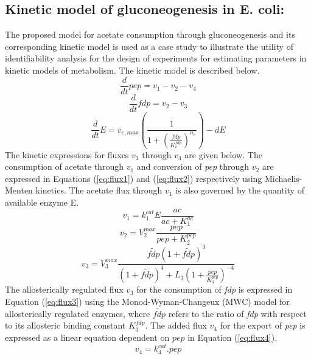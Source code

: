 \documentclass[10pt]{article}
\begin{document}
\subsection{Kinetic model of gluconeogenesis in E. coli:}\label{sec:small-model}
The proposed model for acetate consumption through gluconeogenesis and its corresponding kinetic model is used as a case study to illustrate the utility of identifiability analysis for the design of experiments for estimating parameters in kinetic models of metabolism. The kinetic model is described below.
\begin{equation}\label{eq:ode1}
\frac{d}{dt}pep=v_1-v_2-v_4
\end{equation}
\begin{equation}\label{eq:ode2}
\frac{d}{dt}fdp=v_2-v_3
\end{equation}
\begin{equation}\label{eq:ode3}
\frac{d}{dt}E=v_{e,max}\left(\frac{1}{1+\left(\frac{fdp}{K_{e}^{fdp}}\right)^{n_e}}\right) - d E
\end{equation}
The kinetic expressions for fluxes $v_1$ through $v_4$ are given below. The consumption of acetate through $v_1$ and conversion of \textit{pep} through $v_2$ are expressed in Equations (\ref{eq:flux1}) and (\ref{eq:flux2}) respectively using Michaelis-Menten kinetics. The acetate flux through $v_1$ is also governed by the quantity of available enzyme E. 
\begin{equation}\label{eq:flux1}
v_1 = k_{1}^{cat}E\frac{ac}{ac+K_{1}^{ac}}
\end{equation}	
\begin{equation}\label{eq:flux2}
v_2 = V_{2}^{max}\frac{pep}{pep+K_{2}^{pep}}
\end{equation}
\begin{equation}\label{eq:flux3}
v_3 = V_{3}^{max}\frac{\tilde{fdp}\left(1+\tilde{fdp}\right)^3}{\left(1+\tilde{fdp}\right)^4+L_3\left(1+\frac{pep}{K_{3}^{pep}}\right)^{-4}}
\end{equation}
The allosterically regulated flux $v_3$ for the consumption of \textit{fdp} is expressed in Equation (\ref{eq:flux3}) using the Monod-Wyman-Changeux (MWC) model for allosterically regulated enzymes, where $\tilde{fdp}$ refers to the ratio of \textit{fdp} with respect to its allosteric binding constant $K_{3}^{fdp}$. The added flux $v_4$ for the export of \textit{pep} is expressed as a linear equation dependent on $pep$ in Equation (\ref{eq:flux4}).
\begin{equation}\label{eq:flux4}
v_4 = k_{4}^{cat}.pep
\end{equation}
\end{document}
